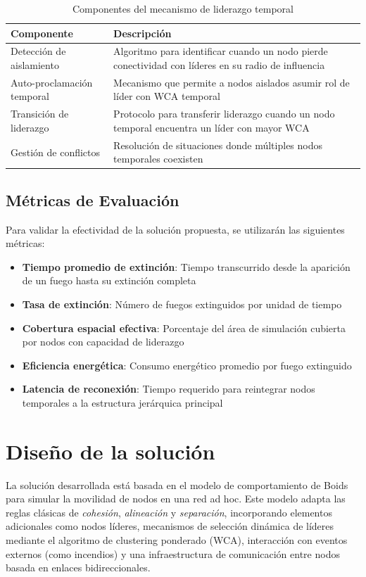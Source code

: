 \documentclass{article}
\begin{document}
\begin{table}[h!]
\centering
\caption{Componentes del mecanismo de liderazgo temporal}
\label{tab:componentes_liderazgo}
\begin{tabular}{p{4cm} p{8cm}}
\toprule
\textbf{Componente} & \textbf{Descripción} \\
\midrule
Detección de aislamiento & Algoritmo para identificar cuando un nodo pierde conectividad con líderes en su radio de influencia \\
Auto-proclamación temporal & Mecanismo que permite a nodos aislados asumir rol de líder con WCA temporal \\
Transición de liderazgo & Protocolo para transferir liderazgo cuando un nodo temporal encuentra un líder con mayor WCA \\
Gestión de conflictos & Resolución de situaciones donde múltiples nodos temporales coexisten \\
\bottomrule
\end{tabular}
\end{table}

\subsection{Métricas de Evaluación}
Para validar la efectividad de la solución propuesta, se utilizarán las siguientes métricas:

\begin{itemize}
    \item \textbf{Tiempo promedio de extinción}: Tiempo transcurrido desde la aparición de un fuego hasta su extinción completa
    \item \textbf{Tasa de extinción}: Número de fuegos extinguidos por unidad de tiempo
    \item \textbf{Cobertura espacial efectiva}: Porcentaje del área de simulación cubierta por nodos con capacidad de liderazgo
    \item \textbf{Eficiencia energética}: Consumo energético promedio por fuego extinguido
    \item \textbf{Latencia de reconexión}: Tiempo requerido para reintegrar nodos temporales a la estructura jerárquica principal
\end{itemize}

\section{Diseño de la solución}

La solución desarrollada está basada en el modelo de comportamiento de Boids para simular la movilidad de nodos en una red ad hoc. Este modelo adapta las reglas clásicas de \textit{cohesión}, \textit{alineación} y \textit{separación}, incorporando elementos adicionales como nodos líderes, mecanismos de selección dinámica de líderes mediante el algoritmo de clustering ponderado (WCA), interacción con eventos externos (como incendios) y una infraestructura de comunicación entre nodos basada en enlaces bidireccionales.
\end{document}
